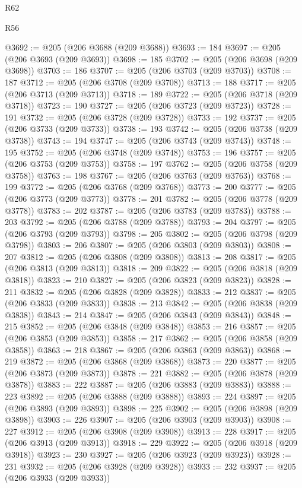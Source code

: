 \begin{lexlean}{R62}
\begin{lexlean}{R56}
\begin{coremodule}
{{{{{{{{{{{{{{{{{{{{{{{{{{{{{{{{{{{{{{{{{{{{{{{{{{{{{{{{{{{{{{{{{{{{{{{{{{{{{{{{{{{{{{{{{{{{{{{{{{{{{{{{{{{{{{{{{{{{{{{{{{{{{{{{{{{{{{{{{{{{{{{{{{{{{{{{{{{{{{{{{{{{{{{{{{{{{{{{{{{{{{{{{{{{{{{{{{{{{{{{{{{{{{{{{{{@3692 := @205 (@206 @3688 (@209 @3688))
@3693 := 184
@3697 := @205 (@206 @3693 (@209 @3693))
@3698 := 185
@3702 := @205 (@206 @3698 (@209 @3698))
@3703 := 186
@3707 := @205 (@206 @3703 (@209 @3703))
@3708 := 187
@3712 := @205 (@206 @3708 (@209 @3708))
@3713 := 188
@3717 := @205 (@206 @3713 (@209 @3713))
@3718 := 189
@3722 := @205 (@206 @3718 (@209 @3718))
@3723 := 190
@3727 := @205 (@206 @3723 (@209 @3723))
@3728 := 191
@3732 := @205 (@206 @3728 (@209 @3728))
@3733 := 192
@3737 := @205 (@206 @3733 (@209 @3733))
@3738 := 193
@3742 := @205 (@206 @3738 (@209 @3738))
@3743 := 194
@3747 := @205 (@206 @3743 (@209 @3743))
@3748 := 195
@3752 := @205 (@206 @3748 (@209 @3748))
@3753 := 196
@3757 := @205 (@206 @3753 (@209 @3753))
@3758 := 197
@3762 := @205 (@206 @3758 (@209 @3758))
@3763 := 198
@3767 := @205 (@206 @3763 (@209 @3763))
@3768 := 199
@3772 := @205 (@206 @3768 (@209 @3768))
@3773 := 200
@3777 := @205 (@206 @3773 (@209 @3773))
@3778 := 201
@3782 := @205 (@206 @3778 (@209 @3778))
@3783 := 202
@3787 := @205 (@206 @3783 (@209 @3783))
@3788 := 203
@3792 := @205 (@206 @3788 (@209 @3788))
@3793 := 204
@3797 := @205 (@206 @3793 (@209 @3793))
@3798 := 205
@3802 := @205 (@206 @3798 (@209 @3798))
@3803 := 206
@3807 := @205 (@206 @3803 (@209 @3803))
@3808 := 207
@3812 := @205 (@206 @3808 (@209 @3808))
@3813 := 208
@3817 := @205 (@206 @3813 (@209 @3813))
@3818 := 209
@3822 := @205 (@206 @3818 (@209 @3818))
@3823 := 210
@3827 := @205 (@206 @3823 (@209 @3823))
@3828 := 211
@3832 := @205 (@206 @3828 (@209 @3828))
@3833 := 212
@3837 := @205 (@206 @3833 (@209 @3833))
@3838 := 213
@3842 := @205 (@206 @3838 (@209 @3838))
@3843 := 214
@3847 := @205 (@206 @3843 (@209 @3843))
@3848 := 215
@3852 := @205 (@206 @3848 (@209 @3848))
@3853 := 216
@3857 := @205 (@206 @3853 (@209 @3853))
@3858 := 217
@3862 := @205 (@206 @3858 (@209 @3858))
@3863 := 218
@3867 := @205 (@206 @3863 (@209 @3863))
@3868 := 219
@3872 := @205 (@206 @3868 (@209 @3868))
@3873 := 220
@3877 := @205 (@206 @3873 (@209 @3873))
@3878 := 221
@3882 := @205 (@206 @3878 (@209 @3878))
@3883 := 222
@3887 := @205 (@206 @3883 (@209 @3883))
@3888 := 223
@3892 := @205 (@206 @3888 (@209 @3888))
@3893 := 224
@3897 := @205 (@206 @3893 (@209 @3893))
@3898 := 225
@3902 := @205 (@206 @3898 (@209 @3898))
@3903 := 226
@3907 := @205 (@206 @3903 (@209 @3903))
@3908 := 227
@3912 := @205 (@206 @3908 (@209 @3908))
@3913 := 228
@3917 := @205 (@206 @3913 (@209 @3913))
@3918 := 229
@3922 := @205 (@206 @3918 (@209 @3918))
@3923 := 230
@3927 := @205 (@206 @3923 (@209 @3923))
@3928 := 231
@3932 := @205 (@206 @3928 (@209 @3928))
@3933 := 232
@3937 := @205 (@206 @3933 (@209 @3933))
}}}}}}}}}}}}}}}}}}}}}}}}}}}}}}}}}}}}}}}}}}}}}}}}}}}}}}}}}}}}}}}}}}}}}}}}}}}}}}}}}}}}}}}}}}}}}}}}}}}}}}}}}}}}}}}}}}}}}}}}}}}}}}}}}}}}}}}}}}}}}}}}}}}}}}}}}}}}}}}}}}}}}}}}}}}}}}}}}}}}}}}}}}}}}}}}}}}}}}}}}}}}}}}}}}}
\end{coremodule}
\end{lexlean}
\end{lexlean}
